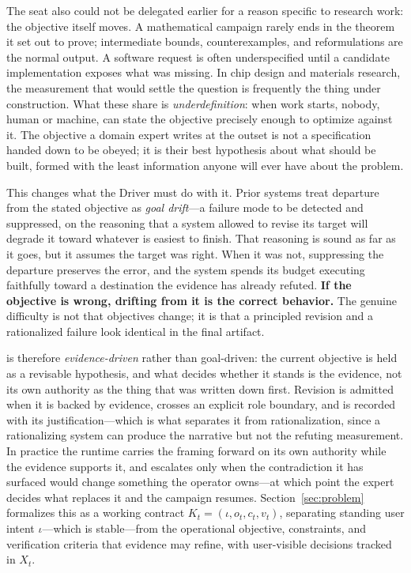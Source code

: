 The seat also could not be delegated earlier for a reason specific to research work:
the objective itself moves. A mathematical campaign rarely ends in the theorem it set
out to prove; intermediate bounds, counterexamples, and reformulations are the normal
output. A software request is often underspecified until a candidate implementation
exposes what was missing. In chip design and materials research, the measurement that
would settle the question is frequently the thing under construction. What these
share is \emph{underdefinition}: when work starts, nobody, human or machine, can state
the objective precisely enough to optimize against it. The objective a domain expert
writes at the outset is not a specification handed down to be obeyed; it is their best
hypothesis about what should be built, formed with the least information anyone will
ever have about the problem.

This changes what the Driver must do with it. Prior systems treat departure from the
stated objective as \emph{goal drift}---a failure mode to be detected and suppressed,
on the reasoning that a system allowed to revise its target will degrade it toward
whatever is easiest to finish. That reasoning is sound as far as it goes, but it
assumes the target was right. When it was not, suppressing the departure preserves
the error, and the system spends its budget executing faithfully toward a destination
the evidence has already refuted. \textbf{If the objective is wrong, drifting from it
is the correct behavior.} The genuine difficulty is not that objectives change; it is
that a principled revision and a rationalized failure look identical in the final
artifact.

\systemname{} is therefore \emph{evidence-driven} rather than goal-driven: the
current objective is held as a revisable hypothesis, and what decides whether it
stands is the evidence, not its own authority as the thing that was written down
first. Revision is admitted when it is backed by evidence, crosses an explicit role
boundary, and is recorded with its justification---which is what separates it from
rationalization, since a rationalizing system can produce the narrative but not the
refuting measurement. In practice the runtime carries the framing forward on its own
authority while the evidence supports it, and escalates only when the contradiction
it has surfaced would change something the operator owns---at which point the expert
decides what replaces it and the campaign resumes.
Section~\ref{sec:problem} formalizes this as a working contract
$K_t=(\iota,o_t,c_t,v_t)$, separating standing user intent $\iota$---which is
stable---from the operational objective, constraints, and verification criteria that
evidence may refine, with user-visible decisions tracked in $X_t$.

